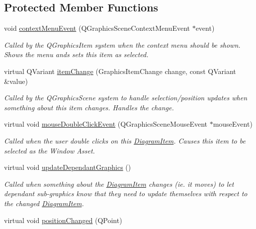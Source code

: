 \subsection*{Protected Member Functions}
\begin{DoxyCompactItemize}
\item 
\hypertarget{class_diagram_item_a019492721af4b32ea0c9ffec4765717a}{void \hyperlink{class_diagram_item_a019492721af4b32ea0c9ffec4765717a}{context\-Menu\-Event} (Q\-Graphics\-Scene\-Context\-Menu\-Event $\ast$event)}\label{class_diagram_item_a019492721af4b32ea0c9ffec4765717a}

\begin{DoxyCompactList}\small\item\em Called by the Q\-Graphics\-Item system when the context menu should be shown. Shows the menu ands sets this item as selected. \end{DoxyCompactList}\item 
virtual Q\-Variant \hyperlink{class_diagram_item_ada966349ddc26ea7b0c04f4f756d9fc3}{item\-Change} (Graphics\-Item\-Change change, const Q\-Variant \&value)
\begin{DoxyCompactList}\small\item\em Called by the Q\-Graphics\-Scene system to handle selection/position updates when something about this item changes. Handles the change. \end{DoxyCompactList}\item 
\hypertarget{class_diagram_item_af98f36c76d28445ef0ca6acc2dba4467}{virtual void \hyperlink{class_diagram_item_af98f36c76d28445ef0ca6acc2dba4467}{mouse\-Double\-Click\-Event} (Q\-Graphics\-Scene\-Mouse\-Event $\ast$mouse\-Event)}\label{class_diagram_item_af98f36c76d28445ef0ca6acc2dba4467}

\begin{DoxyCompactList}\small\item\em Called when the user double clicks on this \hyperlink{class_diagram_item}{Diagram\-Item}. Causes this item to be selected as the Window Asset. \end{DoxyCompactList}\item 
\hypertarget{class_diagram_item_ad254447c06e3b87b0a12399bd3194d0b}{virtual void \hyperlink{class_diagram_item_ad254447c06e3b87b0a12399bd3194d0b}{update\-Dependant\-Graphics} ()}\label{class_diagram_item_ad254447c06e3b87b0a12399bd3194d0b}

\begin{DoxyCompactList}\small\item\em Called when something about the \hyperlink{class_diagram_item}{Diagram\-Item} changes (ie. it moves) to let dependant sub-\/graphics know that they need to update themselves with respect to the changed \hyperlink{class_diagram_item}{Diagram\-Item}. \end{DoxyCompactList}\item 
\hypertarget{class_diagram_item_aac2ecadd8d252d2c41b5308ff1af188b}{virtual void \hyperlink{class_diagram_item_aac2ecadd8d252d2c41b5308ff1af188b}{position\-Changed} (Q\-Point)}\label{class_diagram_item_aac2ecadd8d252d2c41b5308ff1af188b}


\end{DoxyCompactItemize}
